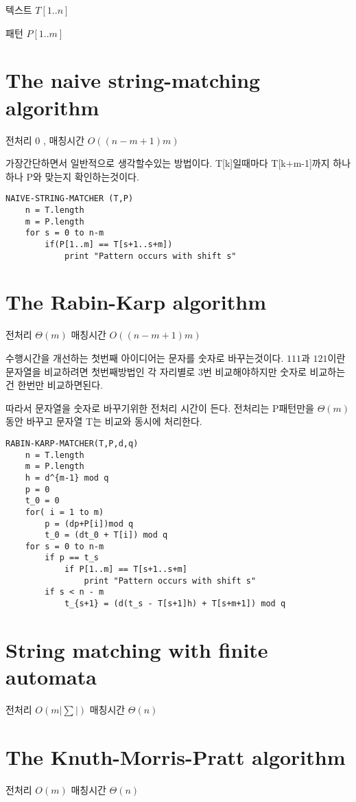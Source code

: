 

텍스트 $T[1..n]$ 

패턴 $P[1..m]$

\section{The naive string-matching algorithm}
전처리 0 , 매칭시간 $O((n-m+1)m)$

가장간단하면서 일반적으로 생각할수있는 방법이다.
T[k]일때마다 T[k+m-1]까지 하나하나 P와 맞는지 확인하는것이다.

\begin{lstlisting}[syle = CStyle]
NAIVE-STRING-MATCHER (T,P)
    n = T.length
    m = P.length
    for s = 0 to n-m
        if(P[1..m] == T[s+1..s+m])
            print "Pattern occurs with shift s"
\end{lstlisting}



\section{The Rabin-Karp algorithm}
전처리 $\Theta(m)$
매칭시간 $O((n-m+1)m)$

수행시간을 개선하는 첫번째 아이디어는 문자를 숫자로 바꾸는것이다.
$111$과 $121$이란 문자열을 비교하려면 첫번째방법인 각 자리별로 3번 비교해야하지만 숫자로 비교하는건 한번만 비교하면된다.

따라서 문자열을 숫자로 바꾸기위한 전처리 시간이 든다.
전처리는 P패턴만을 $\Theta(m)$동안 바꾸고 문자열 T는 비교와 동시에 처리한다.


\begin{lstlisting}[syle = CStyle]
RABIN-KARP-MATCHER(T,P,d,q)
    n = T.length
    m = P.length
    h = d^{m-1} mod q
    p = 0
    t_0 = 0
    for( i = 1 to m)
        p = (dp+P[i])mod q
        t_0 = (dt_0 + T[i]) mod q
    for s = 0 to n-m
        if p == t_s
            if P[1..m] == T[s+1..s+m]
                print "Pattern occurs with shift s"
        if s < n - m
            t_{s+1} = (d(t_s - T[s+1]h) + T[s+m+1]) mod q
\end{lstlisting}


\section{String matching with finite automata}
전처리
$O(m|\sum|)$
매칭시간 $\Theta(n)$

\section{The Knuth-Morris-Pratt algorithm}
전처리
$O(m)$
매칭시간 $\Theta(n)$
